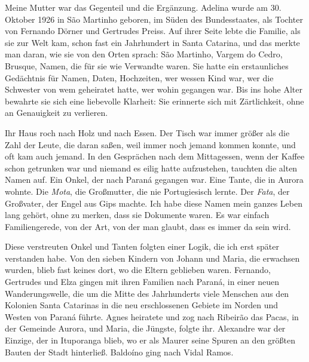 \documentclass[
  ngerman,
  11pt,
  openany]{book}
\begin{document}
Meine Mutter war das Gegenteil und die Ergänzung. Adelina wurde am 30.
Oktober 1926 in São Martinho geboren, im Süden des Bundesstaates, als
Tochter von Fernando Dörner und Gertrudes Preiss. Auf ihrer Seite lebte
die Familie, als sie zur Welt kam, schon fast ein Jahrhundert in Santa
Catarina, und das merkte man daran, wie sie von den Orten sprach: São
Martinho, Vargem do Cedro, Brusque, Namen, die für sie wie Verwandte
waren. Sie hatte ein erstaunliches Gedächtnis für Namen, Daten,
Hochzeiten, wer wessen Kind war, wer die Schwester von wem geheiratet
hatte, wer wohin gegangen war. Bis ins hohe Alter bewahrte sie sich eine
liebevolle Klarheit: Sie erinnerte sich mit Zärtlichkeit, ohne an
Genauigkeit zu verlieren.

Ihr Haus roch nach Holz und nach Essen. Der Tisch war immer größer als
die Zahl der Leute, die daran saßen, weil immer noch jemand kommen
konnte, und oft kam auch jemand. In den Gesprächen nach dem Mittagessen,
wenn der Kaffee schon getrunken war und niemand es eilig hatte
aufzustehen, tauchten die alten Namen auf. Ein Onkel, der nach Paraná
gegangen war. Eine Tante, die in Aurora wohnte. Die \emph{Mota}, die
Großmutter, die nie Portugiesisch lernte. Der \emph{Fata}, der
Großvater, der Engel aus Gips machte. Ich habe diese Namen mein ganzes
Leben lang gehört, ohne zu merken, dass sie Dokumente waren. Es war
einfach Familiengerede, von der Art, von der man glaubt, dass es immer
da sein wird.

Diese verstreuten Onkel und Tanten folgten einer Logik, die ich erst
später verstanden habe. Von den sieben Kindern von Johann und Maria, die
erwachsen wurden, blieb fast keines dort, wo die Eltern geblieben waren.
Fernando, Gertrudes und Elza gingen mit ihren Familien nach Paraná, in
einer neuen Wanderungswelle, die um die Mitte des Jahrhunderts viele
Menschen aus den Kolonien Santa Catarinas in die neu erschlossenen
Gebiete im Norden und Westen von Paraná führte. Agnes heiratete und zog
nach Ribeirão das Pacas, in der Gemeinde Aurora, und Maria, die Jüngste,
folgte ihr. Alexandre war der Einzige, der in Ituporanga blieb, wo er
als Maurer seine Spuren an den größten Bauten der Stadt hinterließ.
Baldoíno ging nach Vidal Ramos.
\end{document}

